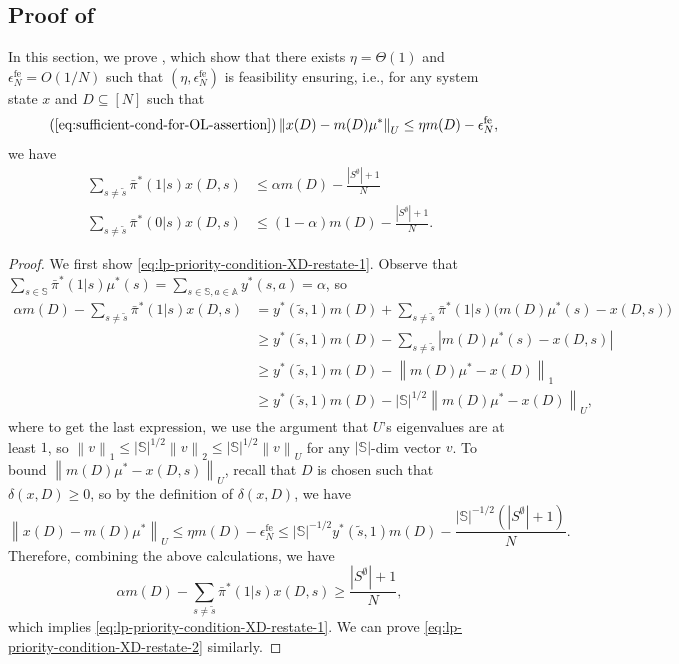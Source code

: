 \documentclass[11pt,letterpaper]{article}
\theoremstyle{plain}
\theoremstyle{definition}
\theoremstyle{remark}
\newcommand{\norm}[1]{\left\lVert#1\right\rVert}
\newcommand{\abs}[1]{\left\lvert#1\right\rvert}
\newcommand{\sspa}{\mathbb{S}}
\newcommand{\aspa}{\mathbb{A}}
\newcommand{\sumsa}{\sum_{s\in\sspa, a\in\aspa}}
\newcommand{\sums}{\sum_{s\in\sspa}}
\newcommand{\pibar}{{\sysbar{\pi}}}
\newcommand{\pibs}{{\pibar^*}}
\newcommand{\sysbar}[1]{\bar{#1}}
\newcommand{\sempty}{S^{\emptyset}}
\newcommand{\statdist}{\mu^*}
\newcommand{\umat}{U}
\newcommand{\errfe}{\epsilon_N^{\text{fe}}}
\newcommand{\sneu}{\tilde{s}}
\newcommand{\slk}{\delta}
\newcommand{\slkb}{\delta}
\begin{document}
\subsection{Proof of }
\label{app:proof-of-exist-fe}

In this section, we prove , which show that there exists $\eta = \Theta(1)$ and $\errfe = O(1/N)$ such that $(\eta, \errfe)$ is feasibility ensuring, i.e., for any system state $x$ and $D\subseteq[N]$ such that
\begin{equation}\tag{\ref{eq:sufficient-cond-for-OL-assertion}}
  \norm{x(D) - m(D) \statdist}_{\umat} \leq \eta m(D) - \errfe,
\end{equation}
we have
\begin{align}
    \label{eq:lp-priority-condition-XD-restate-1}
    \sum\nolimits_{s\neq \sneu} \pibs(1|s) x(D, s) &\leq  \alpha m(D) - \frac{|\sempty|+1}{N} \\ 
    \label{eq:lp-priority-condition-XD-restate-2}
     \sum\nolimits_{s\neq \sneu} \pibs(0|s) x(D, s) &\leq (1-\alpha)m(D) - \frac{|\sempty|+1}{N}. 
\end{align}


\feasibilityensuring*

\begin{proof}    
    We first show \eqref{eq:lp-priority-condition-XD-restate-1}. Observe that $\sums \pibs(1|s) \statdist(s) = \sumsa y^*(s,a) = \alpha$, so 
    \begin{align}
        \nonumber
         \alpha m(D) - \sum_{s\neq \sneu} \pibs(1|s) x(D, s) 
        &= y^*(\sneu, 1)m(D) + \sum_{s\neq\sneu} \pibs(1|s) \big(m(D)\statdist(s) - x(D, s)\big) \\
        \nonumber
        &\geq y^*(\sneu, 1)m(D) - \sum_{s\neq\sneu} \abs{m(D)\statdist(s) - x(D, s)} \\
        \nonumber
        &\geq y^*(\sneu, 1)m(D) - \norm{m(D)\statdist - x(D)}_1 \\
        \nonumber
        &\geq y^*(\sneu, 1)m(D) - |\sspa|^{1/2}\norm{m(D)\statdist - x(D)}_\umat,
    \end{align}
    where to get the last expression, we use the argument that $U$'s eigenvalues are at least $1$, so $\norm{v}_1\leq |\sspa|^{1/2} \norm{v}_2 \leq  |\sspa|^{1/2} \norm{v}_U$ for any $|\sspa|$-dim vector $v$. 
    To bound $\norm{m(D)\statdist - x(D, s)}_\umat$, recall that $D$ is chosen such that $\slkb(x, D) \geq 0$, so by the definition of $\slk(x, D)$, we have
    \[
        \norm{x(D) - m(D) \statdist}_U \leq \eta m(D) - \errfe \leq |\sspa|^{-1/2} y^*(\sneu, 1) m(D) - \frac{|\sspa|^{-1/2}(|\sempty|+1)}{N}.  
    \]
    Therefore, combining the above calculations, we have
    \[
         \alpha m(D) - \sum_{s\neq \sneu} \pibs(1|s) x(D, s) \geq \frac{|\sempty|+1}{N}, 
    \]
    which implies \eqref{eq:lp-priority-condition-XD-restate-1}. We can prove \eqref{eq:lp-priority-condition-XD-restate-2} similarly.
\end{proof}
\end{document}
